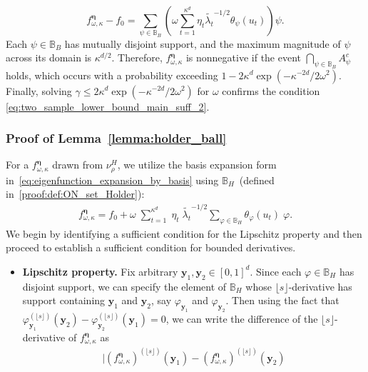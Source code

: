 \documentclass[twoside,11pt]{article}
\newcommand{\floor}[1]{\lfloor #1 \rfloor} %
\newcommand{\vectorize}[1]{\mathbf{#1}}
\newcommand{\dimDensity}{d} %
\newcommand{\ONset}{\mathbb{B}}
\newcommand{\binNum}{\kappa}           %
\newcommand{\coef}{\theta}
\newcommand{\domainTs}{
	[0,1]^{{\dimDensity}}
}
\begin{document}
\begin{appendix}
	\[
	f^{\boldsymbol{\eta}}_{\omega, \binNum} - f_0 = \sum_{\psi \in \ONset_{B}} \left( \omega \sum_{t=1}^{\binNum^{\dimDensity}} \eta_t \tilde{\lambda_t}^{-1/2} \coef_{\psi}(u_t) \right) \psi.
	\]
	Each \( \psi \in \ONset_{B} \) has mutually disjoint support, and the maximum magnitude of \( \psi \) across its domain is \( \binNum^{\dimDensity/2} \). Therefore, \( f^{\boldsymbol{\eta}}_{\omega, \binNum} \) is nonnegative if the event \( \bigcap_{\psi \in \ONset_{B}} A_{\psi}^c \) holds, which occurs with a probability exceeding \( 1-2 \binNum^\dimDensity \exp(-\kappa^{-2\dimDensity}/2\omega^2) \).
	Finally, solving \( \gamma \leq 2 \binNum^\dimDensity \exp(-\binNum^{-2\dimDensity}/2\omega^2) \) for \( \omega \) confirms the condition  \eqref{eq:two_sample_lower_bound_main_suff_2}.
	\subsubsection{Proof of Lemma~\ref{lemma:holder_ball}}
	For a $f^{{\boldsymbol{\eta}}}_{\omega, \binNum}$ 
	drawn from $\nu_\rho^H$,
	we utilize the basis expansion form in~\eqref{eq:eigenfunction_expansion_by_basis} using $\ONset_{H}$~(defined in~\eqref{proof:def:ON_set_Holder}):
	\begin{align*}
		f^{{\boldsymbol{\eta}}}_{\omega, \binNum}
		=
		f_0
		+
		\omega \;
		\sum_{t=1}^{\binNum^{\dimDensity}}
		\; \eta_t \; \tilde{\lambda_t}^{-1/2}
		\sum_{
			\varphi \in \ONset_{H}
		}
		\coef_{\varphi}(u_t) \;\varphi.
	\end{align*}
	We begin by identifying a sufficient condition for the Lipschitz property and then proceed to establish a sufficient condition for bounded derivatives.
	\begin{itemize}
	\item \textbf{Lipschitz property.}
	Fix arbitrary $\vectorize{y}_1, \vectorize{y}_2 \in \domainTs$.
	Since each $\varphi \in \ONset_{H}$ has disjoint support,
	we can specify the element of $\ONset_{H}$ whose $\floor{s}$-derivative has support containing  $\vectorize{y}_1$ and  $\vectorize{y}_2$,
	say  $\varphi_{\vectorize{y}_1}$ and  $\varphi_{\vectorize{y}_2}$.
	Then 
	using the fact that
	$\varphi_{\vectorize{y}_1}^{(\floor{s})}(\vectorize{y}_2) 
	-
	\varphi_{\vectorize{y}_2}^{(\floor{s})}(\vectorize{y}_1) = 0$,
	we can write the difference of the $\floor{s}$-derivative of $f^{{\boldsymbol{\eta}}}_{\omega, \binNum}$ as
	\begin{align*}
		|
		{(f^{{\boldsymbol{\eta}}}_{\omega, \binNum})}^{ (\floor{s})}(\vectorize{y}_1)
		-
		{(f^{{\boldsymbol{\eta}}}_{\omega, \binNum})}^{ (\floor{s})}(\vectorize{y}_2)

\end{align*}
\end{itemize}
\end{appendix}
\end{document}

